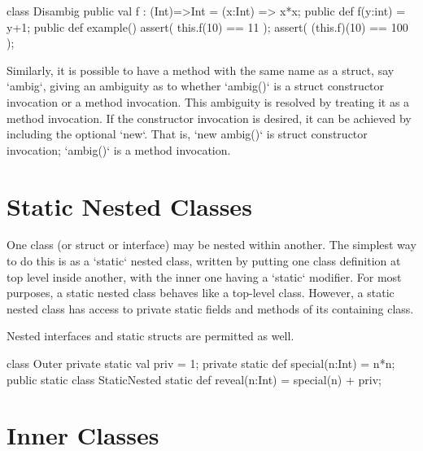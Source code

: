 \begin{ex}

\begin{xten}
class Disambig {
  public val f : (Int)=>Int =  (x:Int) => x*x;
  public def f(y:int) = y+1;
  public def example() {
      assert(  this.f(10)  == 11  );
      assert( (this.f)(10) == 100 );
  }
}
\end{xten}
%

\end{ex}

Similarly, it is possible to have a method with the same name as a struct, say
\xcd`ambig`, giving an ambiguity as to whether \xcd`ambig()` is a struct
constructor invocation or a method invocation.  This ambiguity is resolved by
treating it as a method invocation.  If the constructor invocation is desired,
it can be achieved by including the optional \xcd`new`.  That is, 
\xcd`new ambig()` is struct constructor invocation; \xcd`ambig()` is a 
method invocation.

\section{Static Nested Classes}
\label{StaticNestedClasses}

One class (or struct or interface) may be nested within another.  The simplest
way to do this is as a \xcd`static` nested class, written by putting one class
definition at top level inside another, with the inner one having a
\xcd`static` modifier.  
For most purposes, a static nested class behaves like a top-level class.
However, a static nested class has access to private static
fields and methods of its containing class.  

Nested interfaces and static structs are permitted as well.

\begin{xten}
class Outer {
  private static val priv = 1;
  private static def special(n:Int) = n*n;
  public static class StaticNested {
     static def reveal(n:Int) = special(n) + priv;
  }
}
\end{xten}
%

\section{Inner Classes}
\label{InnerClasses}


